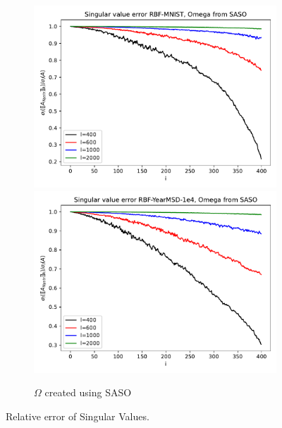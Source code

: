 \documentclass{article}
\theoremstyle{definition}
\begin{document}
\begin{figure}
\begin{subfigure}[t]{0.4\textwidth}
    \includegraphics[width=\textwidth]{plots/singular_values/singular_values_RBF-MNIST_SASO.pdf}
    \includegraphics[width=\textwidth]{plots/singular_values/singular_values_RBF-YearMSD-1e4_SASO.pdf}
    \caption{$\Omega$ created using SASO}
\end{subfigure}\hfill
\caption{Relative error of Singular Values.}
\label{fig:singularValueRatios}
\end{figure}


\end{document}
